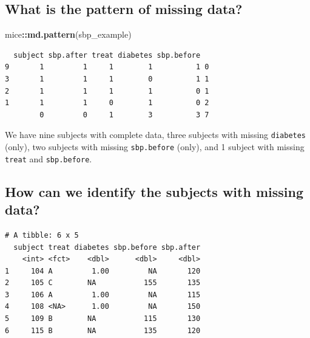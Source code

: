 \documentclass[]{book}
\newenvironment{Shaded}{\begin{snugshade}}{\end{snugshade}}
\newcommand{\KeywordTok}[1]{\textcolor[rgb]{0.13,0.29,0.53}{\textbf{#1}}}
\newcommand{\StringTok}[1]{\textcolor[rgb]{0.31,0.60,0.02}{#1}}
\newcommand{\OperatorTok}[1]{\textcolor[rgb]{0.81,0.36,0.00}{\textbf{#1}}}
\newcommand{\NormalTok}[1]{#1}
\theoremstyle{definition}
\theoremstyle{definition}
\theoremstyle{definition}
\theoremstyle{remark}
\begin{document}
\subsection{What is the pattern of missing
data?}\label{what-is-the-pattern-of-missing-data}

\begin{Shaded}
\begin{Highlighting}[]
\NormalTok{mice}\OperatorTok{::}\KeywordTok{md.pattern}\NormalTok{(sbp_example)}
\end{Highlighting}
\end{Shaded}

\begin{verbatim}
  subject sbp.after treat diabetes sbp.before  
9       1         1     1        1          1 0
3       1         1     1        0          1 1
2       1         1     1        1          0 1
1       1         1     0        1          0 2
        0         0     1        3          3 7
\end{verbatim}

We have nine subjects with complete data, three subjects with missing
\texttt{diabetes} (only), two subjects with missing \texttt{sbp.before}
(only), and 1 subject with missing \texttt{treat} and
\texttt{sbp.before}.

\subsection{How can we identify the subjects with missing
data?}\label{how-can-we-identify-the-subjects-with-missing-data}

\begin{Shaded}
\end{Shaded}

\begin{verbatim}
# A tibble: 6 x 5
  subject treat diabetes sbp.before sbp.after
    <int> <fct>    <dbl>      <dbl>     <dbl>
1     104 A         1.00         NA       120
2     105 C        NA           155       135
3     106 A         1.00         NA       115
4     108 <NA>      1.00         NA       150
5     109 B        NA           115       130
6     115 B        NA           135       120
\end{verbatim}
\end{document}
